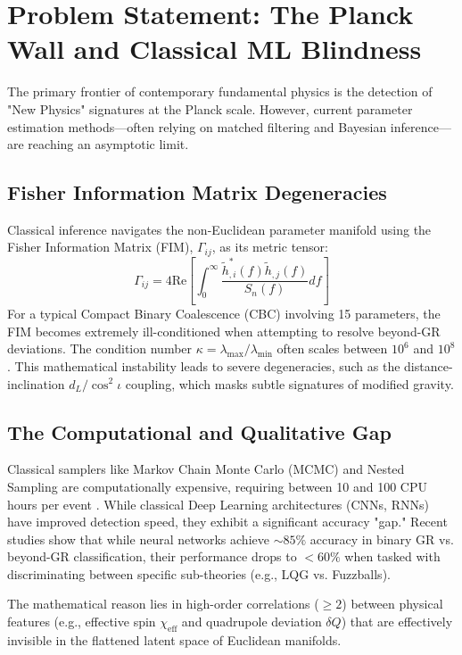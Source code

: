 \documentclass[11pt,a4paper,spanish]{book}
\numberwithin{equation}{chapter}
\numberwithin{figure}{chapter}
\numberwithin{equation}{chapter}
\numberwithin{figure}{chapter}
\numberwithin{table}{chapter}
\begin{document}
\section{Problem Statement: The Planck Wall and Classical ML Blindness}

The primary frontier of contemporary fundamental physics is the detection of "New Physics" signatures at the Planck scale. However, current parameter estimation methods—often relying on matched filtering and Bayesian inference—are reaching an asymptotic limit.

\subsection{Fisher Information Matrix Degeneracies}

Classical inference navigates the non-Euclidean parameter manifold using the Fisher Information Matrix (FIM), $\Gamma_{ij}$, as its metric tensor:
\begin{equation}
    \Gamma_{ij} = 4 \text{Re} \left[ \int_{0}^{\infty} \frac{\tilde{h}^*_{,i}(f) \tilde{h}_{,j}(f)}{S_n(f)} df \right]
\end{equation}
For a typical Compact Binary Coalescence (CBC) involving 15 parameters, the FIM becomes extremely ill-conditioned when attempting to resolve beyond-GR deviations. The condition number $\kappa = \lambda_{\text{max}}/\lambda_{\text{min}}$ often scales between $10^6$ and $10^8$. This mathematical instability leads to severe degeneracies, such as the distance-inclination $d_L/\cos^2 \iota$ coupling, which masks subtle signatures of modified gravity.

\subsection{The Computational and Qualitative Gap}

Classical samplers like Markov Chain Monte Carlo (MCMC) and Nested Sampling are computationally expensive, requiring between 10 and 100 CPU hours per event \cite{Veitch_2015, Blanchet_2014}. While classical Deep Learning architectures (CNNs, RNNs) have improved detection speed, they exhibit a significant accuracy "gap." Recent studies show that while neural networks achieve $\sim85\%$ accuracy in binary GR vs. beyond-GR classification, their performance drops to $<60\%$ when tasked with discriminating between specific sub-theories (e.g., LQG vs. Fuzzballs). 

The mathematical reason lies in high-order correlations ($\ge 2$) between physical features (e.g., effective spin $\chi_{\text{eff}}$ and quadrupole deviation $\delta Q$) that are effectively invisible in the flattened latent space of Euclidean manifolds.
\end{document}
